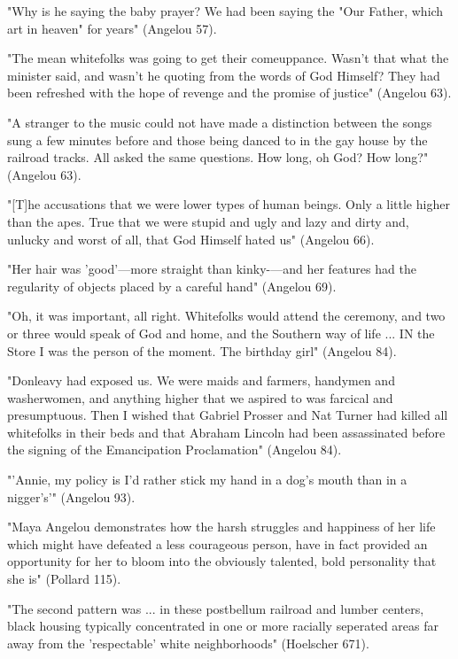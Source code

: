 "Why is he saying the baby prayer? We had been saying the "Our Father, which art in heaven" for years" (Angelou 57).


"The mean whitefolks was going to get their comeuppance. Wasn't that what the minister said, and wasn't he quoting from the words of God Himself? They had been refreshed with the hope of revenge and the promise of justice" (Angelou 63).

"A stranger to the music could not have made a distinction between the songs sung a few minutes before and those being danced to in the gay house by the railroad tracks. All asked the same questions. How long, oh God? How long?" (Angelou 63).

"[T]he accusations that we were lower types of human beings. Only a little higher than the apes. True that we were stupid and ugly and lazy and dirty and, unlucky and worst of all, that God Himself hated us" (Angelou 66).


"Her hair was 'good'—more straight than kinky-—and her
features had the regularity of objects placed by a careful hand" (Angelou 69).

"Oh, it was important, all right. Whitefolks would attend the ceremony, and two or three would speak of God and home, and the Southern way of life ... IN the Store I was the person of the moment. The birthday girl" (Angelou 84).


"Donleavy had exposed us. We were maids and farmers, handymen and washerwomen, and anything higher that we aspired to was farcical and presumptuous. Then I wished that Gabriel Prosser and Nat Turner had killed all whitefolks in their beds and that Abraham Lincoln had been assassinated before the signing of the Emancipation Proclamation" (Angelou 84).


"'Annie, my policy is I'd rather stick my hand in a dog's mouth than in a nigger's'" (Angelou 93).


"Maya Angelou demonstrates how the harsh struggles and happiness of her life which might have defeated a less courageous person, have in fact provided an opportunity for her to bloom into the obviously talented, bold personality that she is" (Pollard 115). 

"The second pattern was ... in these postbellum railroad and lumber centers, black housing typically concentrated  in one or more racially seperated  areas far away from the 'respectable' white neighborhoods" (Hoelscher  671).
